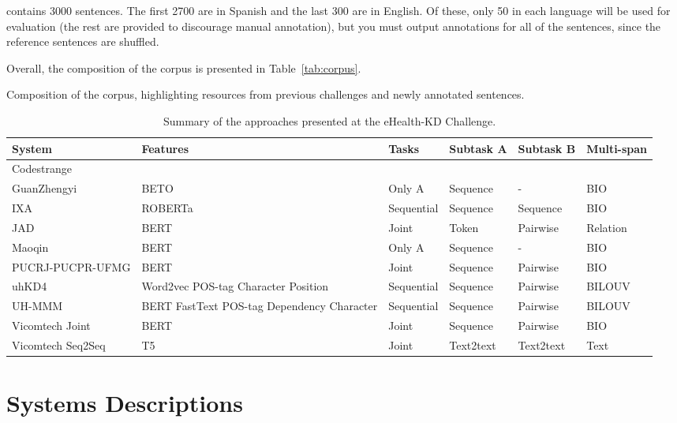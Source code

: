 \documentclass[a4paper,11pt,twocolumn,twoside]{article}
\begin{document}
contains 3000 sentences. The first 2700 are in Spanish and the last 300 are in English. Of these, only 50 in each language will
be used for evaluation (the rest are provided to discourage manual annotation), but you must output annotations for all of the sentences,
since the reference sentences are shuffled.

Overall, the composition of the corpus is presented in Table~\ref{tab:corpus}.

\begin{table}
  \caption{Composition of the corpus, highlighting resources from previous
  challenges and newly annotated sentences.\label{tab:corpus}}
\end{table}

\begin{table*}[t!]
  \centering
  \begin{tabularx}{\textwidth}{lXllll}
    \toprule
    System & Features & Tasks & Subtask A & Subtask B & Multi-span \\
    \midrule
    Codestrange & 				 \\
    GuanZhengyi & BETO & Only A & Sequence & - & BIO \\
    IXA & ROBERTa & Sequential & Sequence & Sequence & BIO \\
    JAD & BERT & Joint & Token & Pairwise & Relation \\
    Maoqin & BERT & Only A & Sequence & - & BIO \\
    PUCRJ-PUCPR-UFMG & BERT & Joint & Sequence & Pairwise & BIO \\
    uhKD4 & Word2vec POS-tag Character Position & Sequential & Sequence & Pairwise & BILOUV \\
    UH-MMM & BERT FastText POS-tag Dependency Character & Sequential & Sequence & Pairwise & BILOUV \\
    Vicomtech Joint & BERT & Joint & Sequence & Pairwise & BIO \\
    Vicomtech Seq2Seq & T5 & Joint & Text2text & Text2text & Text \\
    \bottomrule
  \end{tabularx}
  \caption{Summary of the approaches presented at the eHealth-KD Challenge.\label{tab:participants}}
\end{table*}

\section{Systems Descriptions}\label{sec:systems}
\end{document}

